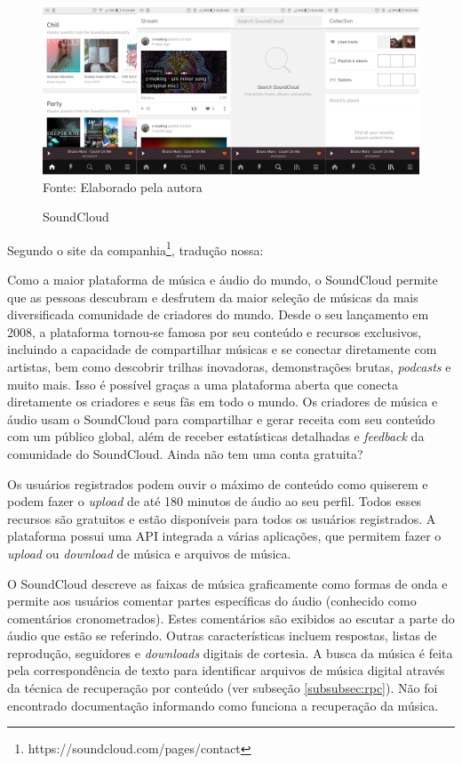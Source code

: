 \begin{figure}[!htb]
   \centering
   \caption{SoundCloud}\label{fig:soundcloud} 
   \includegraphics[scale=0.12]{figuras/soundcloud.jpg}
   \\Fonte: Elaborado pela autora
\end{figure}

Segundo o site da companhia\footnote{https://soundcloud.com/pages/contact}, tradução nossa:

\begin{citacao}
Como a maior plataforma de música e áudio do mundo, o SoundCloud permite que as pessoas descubram e desfrutem da maior seleção de músicas da mais diversificada comunidade de criadores do mundo. Desde o seu lançamento em 2008, a plataforma tornou-se famosa por seu conteúdo e recursos exclusivos, incluindo a capacidade de compartilhar músicas e se conectar diretamente com artistas, bem como descobrir trilhas inovadoras, demonstrações brutas, \textit{podcasts} e muito mais. Isso é possível graças a uma plataforma aberta que conecta diretamente os criadores e seus fãs em todo o mundo. Os criadores de música e áudio usam o SoundCloud para compartilhar e gerar receita com seu conteúdo com um público global, além de receber estatísticas detalhadas e \textit{feedback} da comunidade do SoundCloud. Ainda não tem uma conta gratuita? \cite{soundcloud2007}
\end{citacao}

Os usuários registrados podem ouvir o máximo de conteúdo como quiserem e podem fazer o \textit{upload} de até 180 minutos de áudio ao seu perfil. Todos esses recursos são gratuitos e estão disponíveis para todos os usuários registrados. A plataforma possui uma API integrada a várias aplicações, que permitem fazer o \textit{upload} ou \textit{download} de música e arquivos de música.

O SoundCloud descreve as faixas de música graficamente como formas de onda e permite aos usuários comentar partes específicas do áudio (conhecido como comentários cronometrados). Estes comentários são exibidos ao escutar a parte do áudio que estão se referindo. Outras características incluem respostas, listas de reprodução, seguidores e \textit{downloads} digitais de cortesia. A busca da música é feita pela correspondência de texto para identificar arquivos de música digital através da técnica de recuperação por conteúdo (ver subseção \ref{subsubsec:rpc}). Não foi encontrado documentação informando como funciona a recuperação da música.

